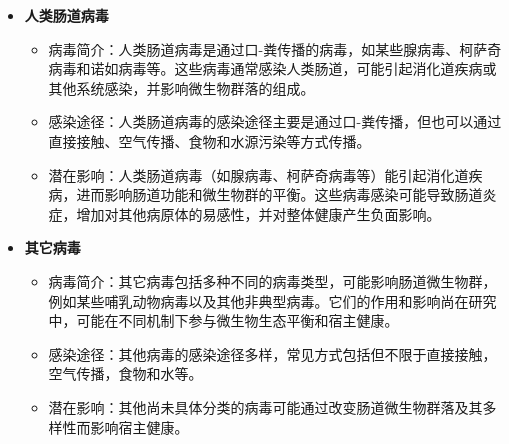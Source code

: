 \documentclass[UTF8]{ctexart}
\begin{document}
\begin{tcolorbox}[
    enhanced,
    colback=lightpurple!10, %
    colframe=white,  %
    arc=3mm,
    boxrule=0.5pt,
    width=\textwidth,
    top=8pt,
    bottom=8pt
]
{\begin{itemize}
    \item \textbf{人类肠道病毒}
    \begin{itemize}
        \item 病毒简介：人类肠道病毒是通过口-粪传播的病毒，如某些腺病毒、柯萨奇病毒和诺如病毒等。这些病毒通常感染人类肠道，可能引起消化道疾病或其他系统感染，并影响微生物群落的组成。
        \item 感染途径：人类肠道病毒的感染途径主要是通过口-粪传播，但也可以通过直接接触、空气传播、食物和水源污染等方式传播。
        \item 潜在影响：人类肠道病毒（如腺病毒、柯萨奇病毒等）能引起消化道疾病，进而影响肠道功能和微生物群的平衡。这些病毒感染可能导致肠道炎症，增加对其他病原体的易感性，并对整体健康产生负面影响。
    \end{itemize}

    \item \textbf{其它病毒}
    \begin{itemize}
        \item 病毒简介：其它病毒包括多种不同的病毒类型，可能影响肠道微生物群，例如某些哺乳动物病毒以及其他非典型病毒。它们的作用和影响尚在研究中，可能在不同机制下参与微生物生态平衡和宿主健康。
        \item 感染途径：其他病毒的感染途径多样，常见方式包括但不限于直接接触，空气传播，食物和水等。
        \item 潜在影响：其他尚未具体分类的病毒可能通过改变肠道微生物群落及其多样性而影响宿主健康。
    \end{itemize}

\end{itemize}

}
\end{tcolorbox}

\newpage
\end{document}
